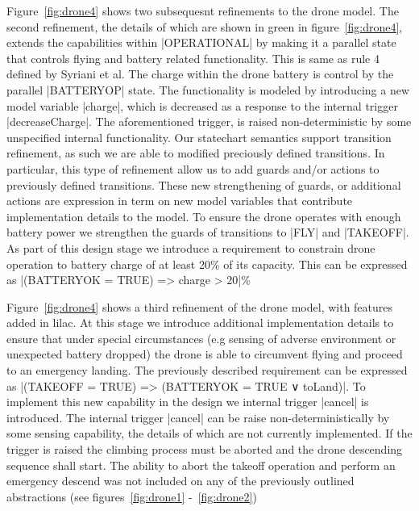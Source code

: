 Figure~\ref{fig:drone4} shows two subsequesnt refinements to the drone model.
The second refinement, the details of which are shown in green in figure~\ref{fig:drone4}, 
extends the capabilities within |OPERATIONAL| by making it a parallel
state that controls flying and battery related functionality. This is same as rule 4 defined by Syriani et al.
The charge within the drone battery is control by the parallel |BATTERYOP| state. 
The functionality is modeled by introducing a new model variable |charge|, which is decreased as 
a response to the internal trigger |decreaseCharge|. The aforementioned trigger, is raised non-deterministic by some 
unspecified internal functionality. Our statechart semantics support transition refinement, as such
we are able to modified preciously defined transitions. In particular, this type of refinement allow
us to add guards and/or actions to previously defined transitions. These new strengthening of guards, or additional 
actions are expression in term on new model variables that contribute implementation details to the model.
To ensure the drone operates with enough battery power we strengthen the guards of transitions to |FLY| and |TAKEOFF|.
As part of this design stage we introduce a requirement to constrain drone operation to battery charge of 
at least 20\% of its capacity. This can be expressed as |(BATTERYOK = TRUE) => charge > 20|\%


Figure~\ref{fig:drone4} shows a third refinement of the drone model, with features added in lilac.
At this stage we introduce additional implementation details to ensure that under special 
circumstances (e.g sensing of adverse environment or unexpected battery dropped) the drone is able 
to circumvent flying and proceed to an emergency landing. The previously described requirement can be
expressed as |(TAKEOFF = TRUE) => (BATTERYOK = TRUE ∨ toLand)|.
To implement this new capability in the design we internal trigger |cancel| is introduced.
The internal trigger |cancel| can be raise non-deterministically by some sensing capability, 
the details of which are not currently implemented. If the trigger is raised the climbing process 
must be aborted and the drone descending sequence shall start. The ability to abort the 
takeoff operation and perform an emergency descend was not included on 
any of the previously outlined abstractions (see figures~\ref{fig:drone1} -~\ref{fig:drone2}) 


